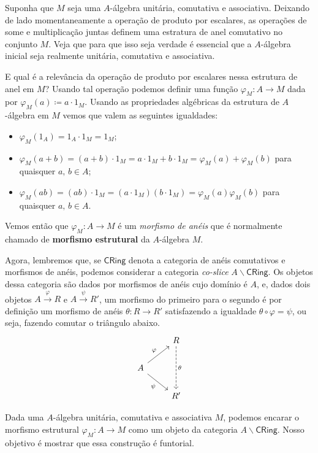 Suponha que $M$ seja uma $A$-álgebra unitária, comutativa e associativa.
Deixando de lado momentaneamente a operação de produto por escalares, as operações de some e multiplicação juntas definem uma estratura de anel comutativo no conjunto $M$.
Veja que para que isso seja verdade é essencial que a $A$-álgebra inicial seja realmente unitária, comutativa e associativa.

E qual é a relevância da operação de produto por escalares nessa estrutura de anel em $M$?
Usando tal operação podemos definir uma função $\varphi_M: A \to M$ dada por $\varphi_M(a) \coloneqq a \cdot 1_M$.
Usando as propriedades algébricas da estrutura de $A$-álgebra em $M$ vemos que valem as seguintes igualdades:
\begin{itemize}
\item $\varphi_M(1_A) = 1_A \cdot 1_M = 1_M$;
  
\item $\varphi_M(a+b) = (a+b) \cdot 1_M = a \cdot 1_M + b \cdot 1_M = \varphi_M(a) + \varphi_M(b)$ para quaisquer $a,\, b \in A$;
  
\item $\varphi_M(ab) = (ab) \cdot 1_M = (a \cdot 1_M)(b \cdot 1_M) = \varphi_M(a)\varphi_M(b)$ para quaisquer $a,\, b \in A$.
\end{itemize}

Vemos então que $\varphi_M: A \to M$ é um \emph{morfismo de anéis} que é normalmente chamado de \textbf{morfismo estrutural} da $A$-álgebra $M$.

Agora, lembremos que, se $\mathsf{CRing}$ denota a categoria de anéis comutativos e morfismos de anéis, podemos considerar a categoria \emph{co-slice} $A\backslash \mathsf{CRing}$.
Os objetos dessa categoria são dados por morfismos de anéis cujo domínio é $A$, e, dados dois objetos $A \overset{\varphi}{\to} R$ e $A \overset{\psi}{\to} R'$, um morfismo do primeiro para o segundo é por definição um morfismo de anéis $\theta: R \to R'$ satisfazendo a igualdade $\theta \circ \varphi = \psi$, ou seja, fazendo comutar o triângulo abaixo.
\begin{displaymath}
  \begin{tikzcd}
    & R
    \arrow[dd, dashed, "\theta"]
    \\ A
    \arrow[ru, "\varphi"]
    \arrow[rd, "\psi" swap]
    \\ & R'
  \end{tikzcd}
\end{displaymath}

Dada uma $A$-álgebra unitária, comutativa e associativa $M$, podemos encarar o morfismo estrutural $\varphi_M: A \to M$ como um objeto da categoria $A \backslash \mathsf{CRing}$.
Nosso objetivo é mostrar que essa construção é funtorial.

